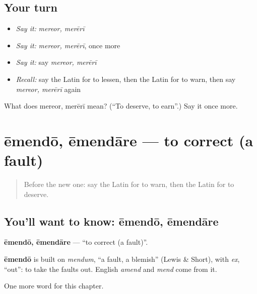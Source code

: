 \subsection*{Your turn}
\begin{itemize}
\raggedright
  \item \emph{Say it:} \emph{mereor, merērī}
  \item \emph{Say it:} \emph{mereor, merērī}, once more
  \item \emph{Say it:} say \emph{mereor, merērī}
  \item \emph{Recall:} say the Latin for to lessen, then the Latin for to warn, then say \emph{mereor, merērī} again
\end{itemize}

\begin{tcolorbox}[breakable,colback=teal!4,colframe=teal!35!black,title={Before you move on}]
What does mereor, merērī mean? (\textquotedblleft{}To deserve, to earn\textquotedblright{}.) Say it once more.
\end{tcolorbox}
\section[ēmendō, ēmendāre]{ēmendō, ēmendāre — to correct (a fault)}

\label{lesson:LA-C257-emendo}



\begin{quote}
Before the new one: say the Latin for to warn, then the Latin for to deserve.
\end{quote}

\subsection*{You'll want to know: ēmendō, ēmendāre}
\textbf{ēmendō, ēmendāre} — \textquotedblleft{}to correct (a fault)\textquotedblright{}.

\begin{cousinweb}
\textbf{ēmendō} is built on \emph{mendum}, \textquotedblleft{}a fault, a blemish\textquotedblright{} (Lewis \& Short), with \emph{ex}, \textquotedblleft{}out\textquotedblright{}: to take the faults out. English \emph{amend} and \emph{mend} come from it.
\end{cousinweb}

\begin{grammarlens}[title={What you've built}]
One more word for this chapter.
\end{grammarlens}

